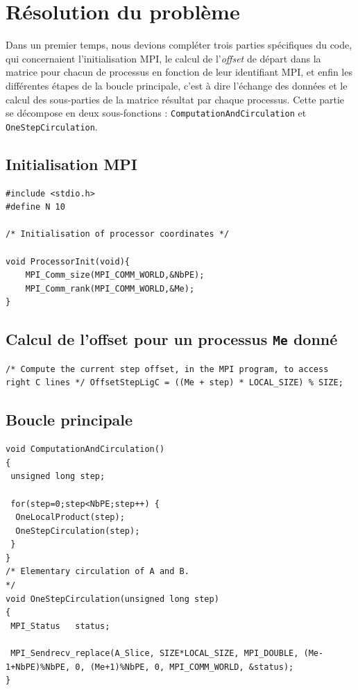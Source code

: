 \documentclass[	DIV=calc,%
							paper=a4,%
							fontsize=11pt,%
							twocolumn]{scrartcl}	 					%
\begin{document}
\section*{Résolution du problème}
Dans un premier temps, nous devions compléter trois parties spécifiques du code, qui concernaient l'initialisation MPI, le calcul de l'\textit{offset} de départ dans la matrice pour chacun de processus en fonction de leur identifiant MPI, et enfin les différentes étapes de la boucle principale, c'est à dire l'échange des données et le calcul des sous-parties de la matrice résultat par chaque processus. Cette partie se décompose en deux sous-fonctions : \texttt{ComputationAndCirculation} et \texttt{OneStepCirculation}.

\subsection*{Initialisation MPI}
\begin{lstlisting}
#include <stdio.h>
#define N 10

/* Initialisation of processor coordinates */

void ProcessorInit(void){
	MPI_Comm_size(MPI_COMM_WORLD,&NbPE);
  	MPI_Comm_rank(MPI_COMM_WORLD,&Me);
}
\end{lstlisting}

\newpage

\subsection*{Calcul de l'offset pour un processus {\texttt{Me} donné}}
\begin{lstlisting}
/* Compute the current step offset, in the MPI program, to access right C lines */ OffsetStepLigC = ((Me + step) * LOCAL_SIZE) % SIZE; 
\end{lstlisting}

\subsection*{Boucle principale}
\begin{lstlisting}
void ComputationAndCirculation()
{
 unsigned long step;
 
 for(step=0;step<NbPE;step++) { 
  OneLocalProduct(step);
  OneStepCirculation(step);
 }
}
/* Elementary circulation of A and B.                                            */
void OneStepCirculation(unsigned long step)
{
 MPI_Status   status;

 MPI_Sendrecv_replace(A_Slice, SIZE*LOCAL_SIZE, MPI_DOUBLE, (Me-1+NbPE)%NbPE, 0, (Me+1)%NbPE, 0, MPI_COMM_WORLD, &status);
}


\end{lstlisting} 
\end{document}
